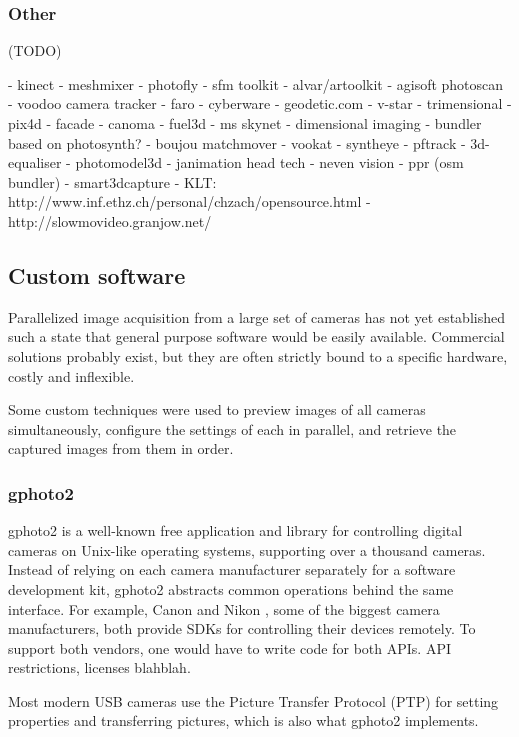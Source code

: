 
\subsubsection{Other}

(TODO)

- kinect
- meshmixer
- photofly
- sfm toolkit
- alvar/artoolkit
- agisoft photoscan
- voodoo camera tracker
- faro
- cyberware
- geodetic.com
- v-star
- trimensional
- pix4d
- facade
- canoma
- fuel3d
- ms skynet
- dimensional imaging
- bundler based on photosynth?
- boujou matchmover
- vookat
- syntheye
- pftrack
- 3d-equaliser
- photomodel3d
- janimation head tech
- neven vision
- ppr (osm bundler)
- smart3dcapture
- KLT: http://www.inf.ethz.ch/personal/chzach/opensource.html
- http://slowmovideo.granjow.net/

\subsection{Custom software}

Parallelized image acquisition from a large set of cameras has not yet established such a state that general purpose software would be easily available.
Commercial solutions probably exist, but they are often strictly bound to a specific hardware, costly and inflexible.

Some custom techniques were used to preview images of all cameras simultaneously, configure the settings of each in parallel, and retrieve the captured images from them in order.

\subsubsection{gphoto2}

gphoto2 \cite{gphoto2} is a well-known free application and library for controlling digital cameras on Unix-like operating systems, supporting over a thousand cameras.
Instead of relying on each camera manufacturer separately for a software development kit, gphoto2 abstracts common operations behind the same interface.
For example, Canon \cite{canonsdk} and Nikon \cite{nikonsdk}, some of the biggest camera manufacturers, both provide SDKs for controlling their devices remotely.
To support both vendors, one would have to write code for both APIs.
API restrictions, licenses blahblah.

Most modern USB cameras use the Picture Transfer Protocol (PTP) \cite{ptpTODO} for setting properties and transferring pictures, which is also what gphoto2 implements.

